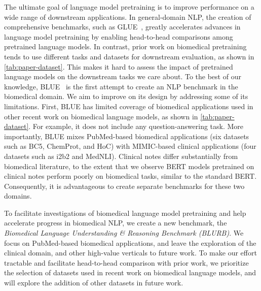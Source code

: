 \documentclass[acmlarge,screen,nonacm]{acmart}
\begin{document}
The ultimate goal of language model pretraining is to improve performance on a wide range of downstream applications. 
In general-domain NLP, the creation of comprehensive benchmarks, such as GLUE~\cite{wang19iclr_glue,wang2019superglue}, greatly accelerates advances in language model pretraining by enabling head-to-head comparisons among pretrained language models. In contrast, prior work on biomedical pretraining tends to use different tasks and datasets for downstream evaluation, as shown in \autoref{tab:paper-dataset}. This makes it hard to assess the impact of pretrained language models on the downstream tasks we care about. 
To the best of our knowledge, BLUE~\cite{peng2019transfer} is the first attempt to create an NLP benchmark in the biomedical domain. We aim to improve on its design by addressing some of its limitations. 
First, BLUE has limited coverage of biomedical applications used in other recent work on biomedical language models, as shown in \autoref{tab:paper-dataset}. For example, it does not include any question-answering task. More importantly, BLUE mixes PubMed-based biomedical applications (six datasets such as BC5, ChemProt, and HoC) with MIMIC-based clinical applications (four datasets such as i2b2 and MedNLI). Clinical notes differ substantially from biomedical literature, to the extent that we observe BERT models pretrained on clinical notes perform poorly on biomedical tasks, similar to the standard BERT. Consequently, it is advantageous to create separate benchmarks for these two domains.

To facilitate investigations of biomedical language model pretraining and help accelerate progress in biomedical NLP, we create a new benchmark, the {\em Biomedical Language Understanding \& Reasoning Benchmark (BLURB)}. 
We focus on PubMed-based biomedical applications, and leave the exploration of the clinical domain, and other high-value verticals to future work. 
To make our effort tractable and facilitate head-to-head comparison with prior work, we prioritize the selection of datasets used in recent work on biomedical language models, and will explore the addition of other datasets in future work. 
\end{document}
